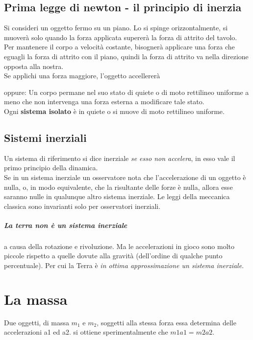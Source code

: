 \documentclass[12pt, a4paper, openany]{book}
\begin{document}
\subsection*{Prima legge di newton - il principio di inerzia}
Si consideri un oggetto fermo su un piano. Lo si spinge orizzontalmente, si muoverà solo quando la forza applicata supererà la forza di attrito del tavolo.
\\Per mantenere il corpo a velocità costante, bisognerà applicare una forza che eguagli la forza di attrito con il piano, quindi la forza di attrito va nella direzione opposta alla nostra.
\\Se applichi una forza maggiore, l'oggetto accellererà

oppure: Un corpo permane nel suo stato di quiete o di moto rettilineo uniforme a meno che
non intervenga una forza esterna a modificare tale stato.
\\Ogni \textbf{sistema isolato} è in quiete o si muove di moto rettilineo uniforme.

\subsection*{Sistemi inerziali}
Un sistema di riferimento si dice inerziale \emph{se esso non accelera}, in esso vale il primo principio della dinamica.
\\Se in un sistema inerziale un osservatore nota che l'accelerazione di un oggetto è
nulla, o, in modo equivalente, che la risultante delle forze è nulla, allora esse
saranno nulle in qualunque altro sistema inerziale. Le leggi della meccanica classica sono invarianti solo per osservatori inerziali.
\subparagraph*{La terra non è un sistema inerziale} a causa della rotazione e rivoluzione.
Ma le accelerazioni in gioco sono molto piccole rispetto a quelle dovute alla gravità
(dell’ordine di qualche punto percentuale). Per cui la Terra è \emph{in ottima approssimazione un
    sistema inerziale}.
\section*{La massa}
Due oggetti, di massa $m_1$ e $m_2$, soggetti alla stessa forza essa determina delle
accelerazioni a1 ed a2. si ottiene sperimentalmente che $m1a1=m2a2$.
\end{document}
